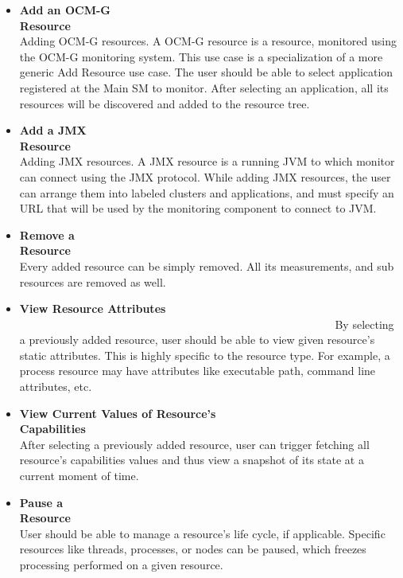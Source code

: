 \begin{itemize}
\item {\bf Add an OCM-G Resource}~~~~~~~~~~~~~~~~~~~~~~~~~~~~~~~~~~~~~~~~~~~~~~~~~~~~~~~~\linebreak
Adding OCM-G resources. A OCM-G resource is a resource, monitored using the OCM-G monitoring system. This use case is a specialization of a more generic Add Resource use case. The user should be able to select application registered at the Main SM to monitor. After selecting an application, all its resources will be discovered and added to the resource tree.

\item {\bf Add a JMX Resource}~~~~~~~~~~~~~~~~~~~~~~~~~~~~~~~~~~~~~~~~~~~~~~~~~~~~~~~~\linebreak
Adding JMX resources. A JMX resource is a running JVM to which monitor can connect using the JMX protocol. While adding JMX resources, the user can arrange them into labeled clusters and applications, and must specify an URL that will be used by the monitoring component to connect to JVM.

\item {\bf Remove a Resource}~~~~~~~~~~~~~~~~~~~~~~~~~~~~~~~~~~~~~~~~~~~~~~~~~~~~~~~~\linebreak
Every added resource can be simply removed. All its measurements, and sub resources are removed as well.

\item {\bf View Resource Attributes} ~~~~~~~~~~~~~~~~~~~~~~~~~~~~~~~~~~~~~~~~~~~~~~~~~~~~~~~~\linebreak
By selecting a previously added resource, user should be able to view given resource's static attributes. This is highly specific to the resource type. For example, a process resource may have attributes like executable path, command line attributes, etc.

\item {\bf View Current Values of Resource's
Capabilities}~~~~~~~~~~~~~~~~~~~~~~~~~~~~~~~~~~~~~~~~~~~~~~~~~~~~~~~~\linebreak
After selecting a previously added resource, user can trigger fetching all resource\rq{}s capabilities values and thus view a snapshot of its state at a current moment of time.

\item {\bf Pause a Resource}~~~~~~~~~~~~~~~~~~~~~~~~~~~~~~~~~~~~~~~~~~~~~~~~~~~~~~~~\linebreak
User should be able to manage a resource\rq{}s life cycle, if applicable. Specific resources like threads, processes, or nodes can be paused, which freezes processing performed on a given resource.


\end{itemize}
